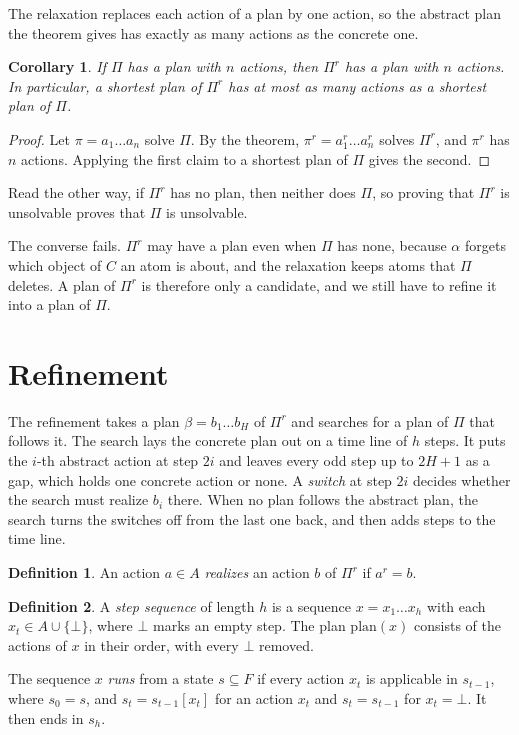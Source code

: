 \documentclass{article}
\theoremstyle{definition}
\newtheorem{definition}{Definition}
\theoremstyle{plain}
\newtheorem{corollary}{Corollary}
\theoremstyle{definition}
\begin{document}
The relaxation replaces each action of a plan by one action, so the abstract plan the theorem gives has exactly as many actions as the concrete one.

\begin{corollary}\label{cor:length}
If $\Pi$ has a plan with $n$ actions, then $\Pi^r$ has a plan with $n$ actions. In particular, a shortest plan of $\Pi^r$ has at most as many actions as a shortest plan of $\Pi$.
\end{corollary}

\begin{proof}
Let $\pi = a_1 \dots a_n$ solve $\Pi$. By the theorem, $\pi^r = a_1^r \dots a_n^r$ solves $\Pi^r$, and $\pi^r$ has $n$ actions. Applying the first claim to a shortest plan of $\Pi$ gives the second.
\end{proof}

Read the other way, if $\Pi^r$ has no plan, then neither does $\Pi$, so proving that $\Pi^r$ is unsolvable proves that $\Pi$ is unsolvable.

The converse fails. $\Pi^r$ may have a plan even when $\Pi$ has none, because $\alpha$ forgets which object of $C$ an atom is about, and the relaxation keeps atoms that $\Pi$ deletes. A plan of $\Pi^r$ is therefore only a candidate, and we still have to refine it into a plan of $\Pi$.

\section{Refinement}\label{sec:refinement}

The refinement takes a plan $\beta = b_1 \dots b_H$ of $\Pi^r$ and searches for a plan of $\Pi$ that follows it. The search lays the concrete plan out on a time line of $h$ steps. It puts the $i$-th abstract action at step $2i$ and leaves every odd step up to $2H+1$ as a gap, which holds one concrete action or none. A \emph{switch} at step $2i$ decides whether the search must realize $b_i$ there. When no plan follows the abstract plan, the search turns the switches off from the last one back, and then adds steps to the time line.

\begin{definition}\label{def:realizes}
An action $a \in A$ \emph{realizes} an action $b$ of $\Pi^r$ if $a^r = b$.
\end{definition}

\begin{definition}\label{def:steps}
A \emph{step sequence} of length $h$ is a sequence $x = x_1 \dots x_h$ with each $x_t \in A \cup \{\bot\}$, where $\bot$ marks an empty step. The plan $\mathrm{plan}(x)$ consists of the actions of $x$ in their order, with every $\bot$ removed.

The sequence $x$ \emph{runs} from a state $s \subseteq F$ if every action $x_t$ is applicable in $s_{t-1}$, where $s_0 = s$, and $s_t = s_{t-1}[x_t]$ for an action $x_t$ and $s_t = s_{t-1}$ for $x_t = \bot$. It then ends in $s_h$.
\end{definition}
\end{document}
